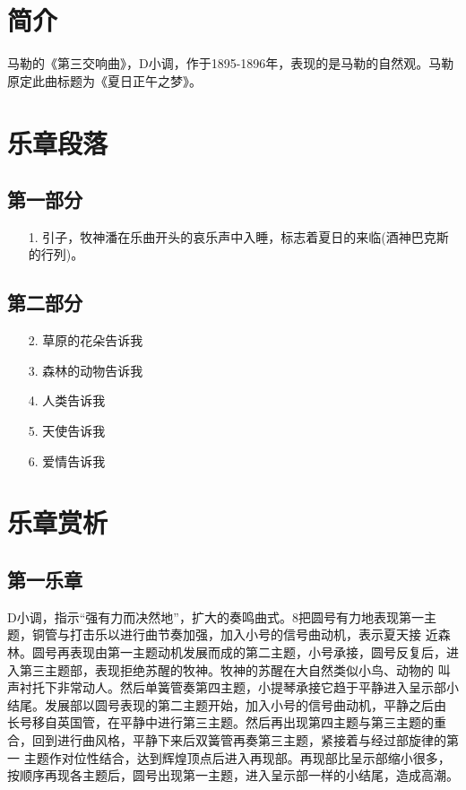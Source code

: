 \documentclass[a4paper,left=2.5cm,right=2.5cm,11pt]{article}
\begin{document}
\tableofcontents

\clearpage

\section{简介}
	马勒的《第三交响曲》，D小调，作于1895-1896年，表现的是马勒的自然观。马勒原定此曲标题为《夏日正午之梦》。

\section{乐章段落}
\subsection{第一部分}
	\begin{itemize}
		\item[1.] 引子，牧神潘在乐曲开头的哀乐声中入睡，标志着夏日的来临(酒神巴克斯的行列)。
	\end{itemize}

\subsection{第二部分}
	\begin{itemize}
		\item[2.]草原的花朵告诉我
		\item[3.]森林的动物告诉我
		\item[4.]人类告诉我
		\item[5.]天使告诉我
		\item[6.]爱情告诉我
	\end{itemize}

\section{乐章赏析}
\subsection{第一乐章}
	D小调，指示“强有力而决然地”，扩大的奏鸣曲式。8把圆号有力地表现第一主题，铜管与打击乐以进行曲节奏加强，加入小号的信号曲动机，表示夏天接 近森林。圆号再表现由第一主题动机发展而成的第二主题，小号承接，圆号反复后，进入第三主题部，表现拒绝苏醒的牧神。牧神的苏醒在大自然类似小鸟、动物的 叫声衬托下非常动人。然后单簧管奏第四主题，小提琴承接它趋于平静进入呈示部小结尾。发展部以圆号表现的第二主题开始，加入小号的信号曲动机，平静之后由 长号移自英国管，在平静中进行第三主题。然后再出现第四主题与第三主题的重合，回到进行曲风格，平静下来后双簧管再奏第三主题，紧接着与经过部旋律的第一 主题作对位性结合，达到辉煌顶点后进入再现部。再现部比呈示部缩小很多，按顺序再现各主题后，圆号出现第一主题，进入呈示部一样的小结尾，造成高潮。
\end{document}
